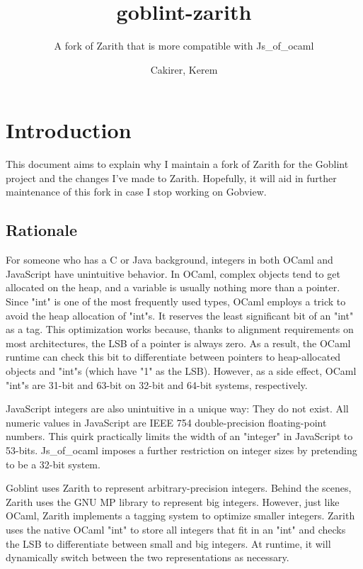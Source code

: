 \documentclass{scrartcl}
\title{goblint-zarith}
\subtitle{A fork of Zarith that is more compatible with Js\_of\_ocaml}
\author{Cakirer, Kerem}
\begin{document}
\maketitle

\section{Introduction}

This document aims to explain why I maintain a fork of Zarith for the Goblint project and the changes I've made to Zarith. Hopefully, it will aid in further maintenance of this fork in case I stop working on Gobview.

\subsection{Rationale}

For someone who has a C or Java background, integers in both OCaml and JavaScript have unintuitive behavior. In OCaml, complex objects tend to get allocated on the heap, and a variable is usually nothing more than a pointer. Since "int" is one of the most frequently used types, OCaml employs a trick to avoid the heap allocation of "int"s. It reserves the least significant bit of an "int" as a tag. This optimization works because, thanks to alignment requirements on most architectures, the LSB of a pointer is always zero. As a result, the OCaml runtime can check this bit to differentiate between pointers to heap-allocated objects and "int"s (which have "1" as the LSB). However, as a side effect, OCaml "int"s are 31-bit and 63-bit on 32-bit and 64-bit systems, respectively.

JavaScript integers are also unintuitive in a unique way: They do not exist. All numeric values in JavaScript are IEEE 754 double-precision floating-point numbers. This quirk practically limits the width of an "integer" in JavaScript to 53-bits. Js\_of\_ocaml imposes a further restriction on integer sizes by pretending to be a 32-bit system.

Goblint uses Zarith to represent arbitrary-precision integers. Behind the scenes, Zarith uses the GNU MP library to represent big integers. However, just like OCaml, Zarith implements a tagging system to optimize smaller integers. Zarith uses the native OCaml "int" to store all integers that fit in an "int" and checks the LSB to differentiate between small and big integers. At runtime, it will dynamically switch between the two representations as necessary.
\end{document}
